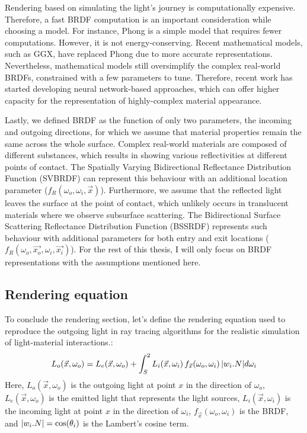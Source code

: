 Rendering based on simulating the light's journey is computationally expensive. Therefore, a fast BRDF computation is an important consideration while choosing a model. For instance, Phong is a simple model that requires fewer computations. However, it is not energy-conserving. Recent mathematical models, such as GGX, have replaced Phong due to more accurate representations. Nevertheless, mathematical models still oversimplify the complex real-world BRDFs, constrained with a few parameters to tune. Therefore, recent work has started developing neural network-based approaches, which can offer higher capacity for the representation of highly-complex material appearance.

Lastly, we defined BRDF as the function of only two parameters, the incoming and outgoing directions, for which we assume that material properties remain the same across the whole surface. Complex real-world materials are composed of different substances, which results in showing various reflectivities at different points of contact. The Spatially Varying Bidirectional Reflectance Distribution Function (SVBRDF) can represent this behaviour with an additional location parameter ($f_R(\omega_o, \omega_i,  \vec{x})$). Furthermore, we assume that the reflected light leaves the surface at the point of contact, which unlikely occurs in translucent materials where we observe subsurface scattering. The Bidirectional Surface Scattering Reflectance Distribution Function (BSSRDF) represents such behaviour with additional parameters for both entry and exit locations ($f_R(\omega_o, \vec{x_o}, \omega_i,  \vec{x_i})$). For the rest of this thesis, I will only focus on BRDF representations with the assumptions mentioned here.

\subsection{Rendering equation}

To conclude the rendering section, let's define the rendering equation used to reproduce the outgoing light in ray tracing algorithms for the realistic simulation of light-material interactions.:
\begin{equation}
L_o(\vec{x}, \omega_o) = L_e(\vec{x}, \omega_o)  +  \int_S^2 L_i(\vec{x}, \omega_i) \, f_{\vec{x}}(\omega_o,  \omega_i) \, \lvert w_i . N\rvert d\omega_i
\label{eqn:rendering-eqn}
\end{equation}
Here, $L_o(\vec{x}, \omega_o) $ is the outgoing light at point $x$ in the direction of $\omega_o$, $L_e(\vec{x}, \omega_o)$ is the emitted light that represents the light sources, $L_i(\vec{x}, \omega_i) $ is the incoming light at point $x$ in the direction of $\omega_i$, $f_{\vec{x}}(\omega_o,  \omega_i)$ is the BRDF, and $\lvert w_i . N\rvert = \cos(\theta_i)$ is the Lambert's cosine term.

